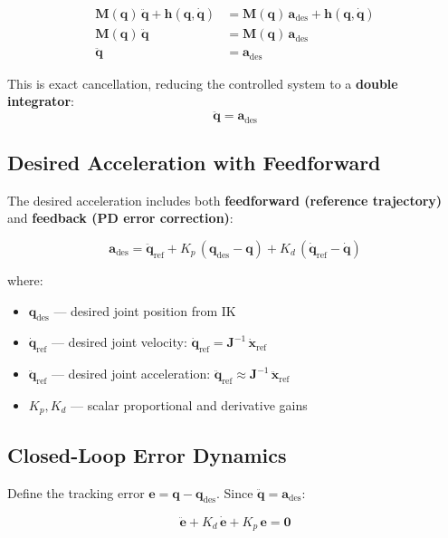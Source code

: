 \documentclass[11pt,a4paper]{article}
\newcommand{\bq}{\bm{q}}
\newcommand{\bdq}{\dot{\bm{q}}}
\newcommand{\bddq}{\ddot{\bm{q}}}
\newcommand{\bM}{\bm{M}}
\newcommand{\bh}{\bm{h}}
\newcommand{\bJ}{\bm{J}}
\begin{document}
\begin{align}
    \bM(\bq)\,\bddq + \bh(\bq, \bdq) &= \bM(\bq)\,\bm{a}_{\mathrm{des}} + \bh(\bq, \bdq) \\
    \bM(\bq)\,\bddq &= \bM(\bq)\,\bm{a}_{\mathrm{des}} \\
    \bddq &= \bm{a}_{\mathrm{des}}
\end{align}

This is exact cancellation, reducing the controlled system to a \textbf{double integrator}:
\[
    \bddq = \bm{a}_{\mathrm{des}}
\]

\subsection{Desired Acceleration with Feedforward}

The desired acceleration includes both \textbf{feedforward (reference trajectory)} and \textbf{feedback (PD error correction)}:

\begin{equation}
\boxed{
\bm{a}_{\mathrm{des}} = \bddq_{\mathrm{ref}} + K_p\,(\bq_{\mathrm{des}} - \bq) + K_d\,(\bdq_{\mathrm{ref}} - \bdq)
}
\label{eq:a_des}
\end{equation}

\noindent where:
\begin{itemize}[leftmargin=2em]
    \item $\bq_{\mathrm{des}}$ --- desired joint position from IK
    \item $\bdq_{\mathrm{ref}}$ --- desired joint velocity: $\bdq_{\mathrm{ref}} = \bJ^{-1}\,\dot{\bm{x}}_{\mathrm{ref}}$
    \item $\bddq_{\mathrm{ref}}$ --- desired joint acceleration: $\bddq_{\mathrm{ref}} \approx \bJ^{-1}\,\ddot{\bm{x}}_{\mathrm{ref}}$
    \item $K_p, K_d$ --- scalar proportional and derivative gains
\end{itemize}

\subsection{Closed-Loop Error Dynamics}

Define the tracking error $\bm{e} = \bq - \bq_{\mathrm{des}}$. Since $\bddq = \bm{a}_{\mathrm{des}}$:

\begin{equation}
    \ddot{\bm{e}} + K_d\,\dot{\bm{e}} + K_p\,\bm{e} = \bm{0}
\end{equation}
\end{document}
